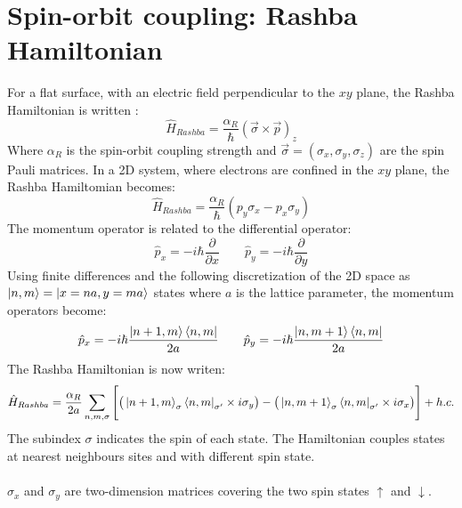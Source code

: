 \documentclass[letterpaper,12pt]{article}
\begin{document}
\section{Spin-orbit coupling: Rashba Hamiltonian}
For a flat surface, with an electric field perpendicular to the $xy$ plane, the Rashba Hamiltonian is written \cite{Manchon2015}:
\begin{equation}
    \hat{H}_{Rashba} = \frac{\alpha_R}{\hbar}(\Vec{\sigma}\times\Vec{p})_z
\end{equation}
Where $\alpha_R$ is the spin-orbit coupling strength and $\Vec{\sigma} = (\sigma_x, \sigma_y, \sigma_z)$ are the spin Pauli matrices. In a 2D system, where electrons are confined in the $xy$ plane, the Rashba Hamiltomian becomes:
\begin{equation}
    \hat{H}_{Rashba} = \frac{\alpha_R}{\hbar}(p_y\sigma_x - p_x\sigma_y)
    \label{2D}
\end{equation}
The momentum operator is related to the differential operator:
\begin{equation}
    \hat{p}_x = -i\hbar\frac{\partial}{\partial x} \qquad \hat{p}_y = -i\hbar\frac{\partial}{\partial y}
\end{equation}
Using finite differences and the following discretization of the 2D space as $\ket{n, m} = \ket{x = na, y = ma}$ states where $a$ is the lattice parameter, the momentum operators become\cite{thesis}:
\begin{equation}
    \hat{p}_x = -i\hbar \frac{\ket{n+1, m}\bra{n, m}}{2a} \qquad  \hat{p}_y = -i\hbar \frac{\ket{n, m+1}\bra{n, m}}{2a}
\end{equation}
The Rashba Hamiltonian is now writen:
\begin{equation}
    \hat{H}_{Rashba} = \frac{\alpha_R}{2a}\sum_{n, m, \sigma}\Bigg[ \big(\ket{n+1, m}_\sigma\bra{n, m}_{\sigma'}\times i\sigma_y\big) - \big(\ket{n, m+1}_{\sigma}\bra{n, m}_{\sigma'}\times i\sigma_x \big)\Bigg] + h.c.
     \label{tight}
\end{equation}
The subindex $\sigma$ indicates the spin of each state. The Hamiltonian couples states at nearest neighbours sites and with different spin state. \\ \\
$\sigma_x$ and $\sigma_y$ are two-dimension matrices covering the two spin states $\uparrow$ and $\downarrow$. 
\end{document}
